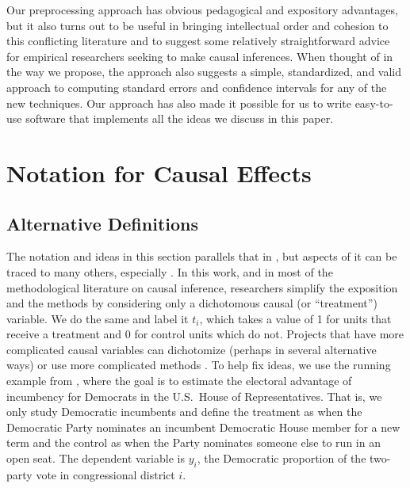 \documentclass[11pt,titlepage]{article}
\begin{document}
Our preprocessing approach has obvious pedagogical and expository
advantages, but it also turns out to be useful in bringing
intellectual order and cohesion to this conflicting literature and to
suggest some relatively straightforward advice for empirical
researchers seeking to make causal inferences.  When thought of in the
way we propose, the approach also suggests a simple, standardized, and
valid approach to computing standard errors and confidence intervals
for any of the new techniques.  Our approach has also made it possible
for us to write easy-to-use software that implements all the ideas we
discuss in this paper.

\section{Notation for Causal Effects}

\subsection{Alternative Definitions}

The notation and ideas in this section parallels that in \citet[][.1]{KinKeoVer94}, but aspects of it can be traced to many others,
especially \citet{Rubin74,Holland86}.  In this work, and in most of
the methodological literature on causal inference, researchers
simplify the exposition and the methods by considering only a
dichotomous causal (or ``treatment'') variable.  We do the same and
label it $t_i$, which takes a value of 1 for units that receive a
treatment and 0 for control units which do not.  Projects that have
more complicated causal variables can dichotomize (perhaps in several
alternative ways) or use more complicated methods \citep{ImaDyk03}.
To help fix ideas, we use the running example from
\citet{KinKeoVer94}, where the goal is to estimate the electoral
advantage of incumbency for Democrats in the U.S.\ House of
Representatives.  That is, we only study Democratic incumbents and
define the treatment as when the Democratic Party nominates an
incumbent Democratic House member for a new term and the control as
when the Party nominates someone else to run in an open seat.  The
dependent variable is $y_i$, the Democratic proportion of the
two-party vote in congressional district $i$.
\end{document}
